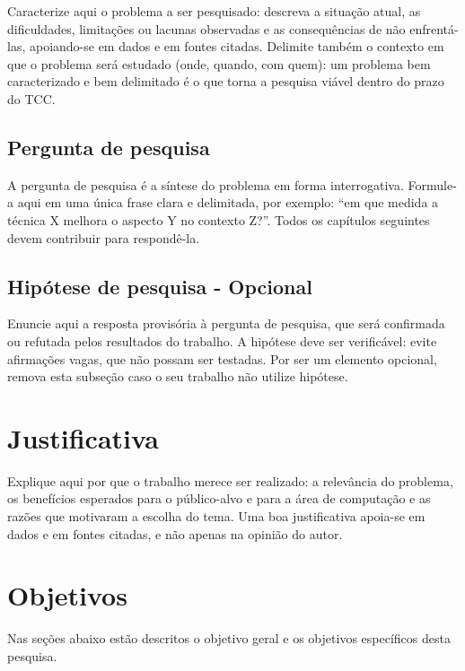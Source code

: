 \documentclass[tcc,capa]{texifsap}
\begin{document}

Caracterize aqui o problema a ser pesquisado: descreva a situação
atual, as dificuldades, limitações ou lacunas observadas e as
consequências de não enfrentá-las, apoiando-se em dados e em fontes
citadas. Delimite também o contexto em que o problema será estudado
(onde, quando, com quem): um problema bem caracterizado e bem
delimitado é o que torna a pesquisa viável dentro do prazo do TCC.

\subsection{Pergunta de pesquisa}

A pergunta de pesquisa é a síntese do problema em forma interrogativa.
Formule-a aqui em uma única frase clara e delimitada, por exemplo:
``em que medida a técnica X melhora o aspecto Y no contexto Z?''. Todos
os capítulos seguintes devem contribuir para respondê-la.

\subsection{Hipótese de pesquisa - Opcional}

Enuncie aqui a resposta provisória à pergunta de pesquisa, que será
confirmada ou refutada pelos resultados do trabalho. A hipótese deve
ser verificável: evite afirmações vagas, que não possam ser testadas.
Por ser um elemento opcional, remova esta subseção caso o seu trabalho
não utilize hipótese.

\section{Justificativa}

Explique aqui por que o trabalho merece ser realizado: a relevância do
problema, os benefícios esperados para o público-alvo e para a área de
computação e as razões que motivaram a escolha do tema. Uma boa
justificativa apoia-se em dados e em fontes citadas, e não apenas na
opinião do autor.



\section{Objetivos}

Nas seções abaixo estão descritos o objetivo geral e os objetivos
específicos desta pesquisa.
\end{document}
